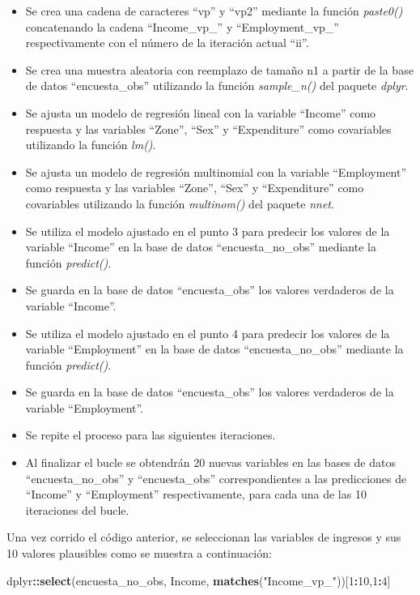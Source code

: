 \documentclass[
  12pt,
]{book}
\newenvironment{Shaded}{\begin{snugshade}}{\end{snugshade}}
\newcommand{\DecValTok}[1]{\textcolor[rgb]{0.00,0.00,0.81}{#1}}
\newcommand{\FunctionTok}[1]{\textcolor[rgb]{0.13,0.29,0.53}{\textbf{#1}}}
\newcommand{\NormalTok}[1]{#1}
\newcommand{\SpecialCharTok}[1]{\textcolor[rgb]{0.81,0.36,0.00}{\textbf{#1}}}
\newcommand{\StringTok}[1]{\textcolor[rgb]{0.31,0.60,0.02}{#1}}
\begin{document}
\begin{itemize}
\item
  Se crea una cadena de caracteres ``vp'' y ``vp2'' mediante la función \emph{paste0()} concatenando la cadena ``Income\_vp\_'' y ``Employment\_vp\_'' respectivamente con el número de la iteración actual ``ii''.
\item
  Se crea una muestra aleatoria con reemplazo de tamaño n1 a partir de la base de datos ``encuesta\_obs'' utilizando la función \emph{sample\_n()} del paquete \emph{dplyr}.
\item
  Se ajusta un modelo de regresión lineal con la variable ``Income'' como respuesta y las variables ``Zone'', ``Sex'' y ``Expenditure'' como covariables utilizando la función \emph{lm()}.
\item
  Se ajusta un modelo de regresión multinomial con la variable ``Employment'' como respuesta y las variables ``Zone'', ``Sex'' y ``Expenditure'' como covariables utilizando la función \emph{multinom()} del paquete \emph{nnet}.
\item
  Se utiliza el modelo ajustado en el punto 3 para predecir los valores de la variable ``Income'' en la base de datos ``encuesta\_no\_obs'' mediante la función \emph{predict()}.
\item
  Se guarda en la base de datos ``encuesta\_obs'' los valores verdaderos de la variable ``Income''.
\item
  Se utiliza el modelo ajustado en el punto 4 para predecir los valores de la variable ``Employment'' en la base de datos ``encuesta\_no\_obs'' mediante la función \emph{predict()}.
\item
  Se guarda en la base de datos ``encuesta\_obs'' los valores verdaderos de la variable ``Employment''.
\item
  Se repite el proceso para las siguientes iteraciones.
\item
  Al finalizar el bucle se obtendrán 20 nuevas variables en las bases de datos ``encuesta\_no\_obs'' y ``encuesta\_obs'' correspondientes a las predicciones de ``Income'' y ``Employment'' respectivamente, para cada una de las 10 iteraciones del bucle.
\end{itemize}

Una vez corrido el código anterior, se seleccionan las variables de ingresos y sus 10 valores plausibles como se muestra a continuación:

\begin{Shaded}
\begin{Highlighting}[]
\NormalTok{dplyr}\SpecialCharTok{::}\FunctionTok{select}\NormalTok{(encuesta\_no\_obs, Income, }\FunctionTok{matches}\NormalTok{(}\StringTok{"Income\_vp\_"}\NormalTok{))[}\DecValTok{1}\SpecialCharTok{:}\DecValTok{10}\NormalTok{,}\DecValTok{1}\SpecialCharTok{:}\DecValTok{4}\NormalTok{]}
\end{Highlighting}
\end{Shaded}
\end{document}

